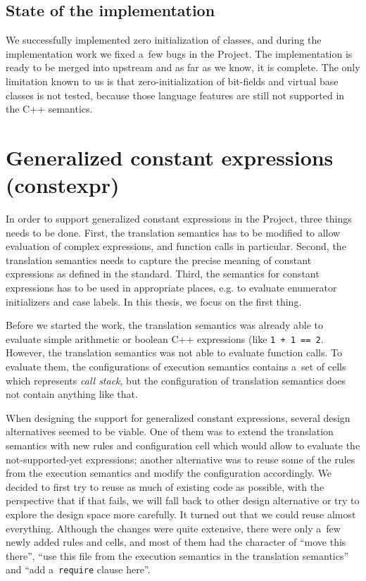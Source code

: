 \documentclass[nolot,nolof,nocover,printed]{fithesis3}
\newcommand{\Project}{Project\xspace}
\begin{document}
\subsection{State of the implementation}

We successfully implemented zero initialization of classes, and during the implementation work we fixed a~few bugs in the \Project. The implementation is ready to be merged into upstream and as far as we know, it is complete. The only limitation known to us is that zero-initialization of bit-fields and virtual base classes is not tested, because those language features are still not supported in the C++ semantics.

\section{Generalized constant expressions (constexpr)} \label{sec:impl:constexpr}

In order to support generalized constant expressions in the \Project, three things needs to be done. First, the translation semantics has to be modified to allow evaluation of complex expressions, and function calls in particular. Second, the translation semantics needs to capture the precise meaning of constant expressions as defined in the standard. Third, the semantics for constant expressions has to be used in appropriate places, e.g. to evaluate enumerator initializers and case labels. In this thesis, we focus on the first thing.

Before we started the work, the translation semantics was already able to evaluate simple arithmetic or boolean C++ expressions (like \lstinline|1 + 1 == 2|. However, the translation semantics was not able to evaluate function calls. To evaluate them, the configurations of execution semantics contains a~set of cells which represents \textit{call stack}, but the configuration of translation semantics does not contain anything like that.

When designing the support for generalized constant expressions, several design alternatives seemed to be viable. One of them was to extend the translation semantics with new rules and configuration cell which would allow to evaluate the not-supported-yet expressions; another alternative was to reuse some of the rules from the execution semantics and modify the configuration accordingly. We decided to first try to reuse as much of existing code as possible, with the perspective that if that fails, we will fall back to other design alternative or try to explore the design space more carefully. It turned out that we could reuse almost everything. Although the changes were quite extensive, there were only a~few newly added rules and cells, and most of them had the character of \enquote{move this there}, \enquote{use this file from the execution semantics in the translation semantics} and \enquote{add a~\lstinline|require| clause here}.
\end{document}
